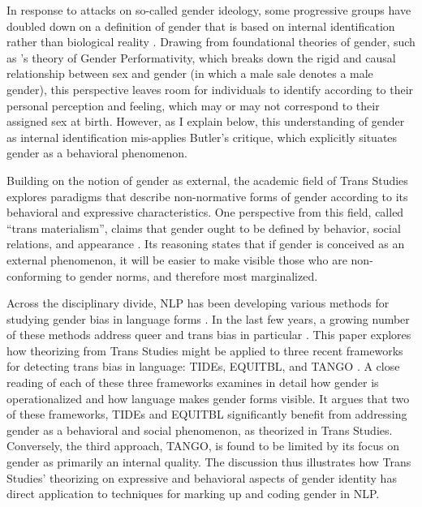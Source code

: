 \documentclass[anonymous,review]{acmart}
\begin{document}
In response to attacks on so-called gender ideology, some progressive groups have doubled down on a definition of gender that is based on internal identification rather than biological reality \citep{drescher:2025}. Drawing from foundational theories of gender, such as \citet{butler:1990}'s theory of Gender Performativity, which breaks down the rigid and causal relationship between sex and gender (in which a male sale denotes a male gender), this perspective leaves room for individuals to identify according to their personal perception and feeling, which may or may not correspond to their assigned sex at birth. However, as I explain below, this understanding of gender as internal identification mis-applies Butler’s critique, which explicitly situates gender as a behavioral phenomenon.

Building on the notion of gender as external, the academic field of Trans Studies explores paradigms that describe non-normative forms of gender according to its behavioral and expressive characteristics. One perspective from this field, called “trans materialism”, claims that gender ought to be defined by behavior, social relations, and appearance \citep{amin:2022}. Its reasoning states that if gender is conceived as an external phenomenon, it will be easier to make visible those who are non-conforming to gender norms, and therefore most marginalized.

Across the disciplinary divide, NLP has been developing various methods for studying gender bias in language forms \citep{bolukbasi:2016,rudinger:2018,guo:2021,kaneko:2024}. In the last few years, a growing number of these methods address queer and trans bias in particular \citep{felkner:2023,ovalle:2023,lameiro:2025,devinney:2024}. This paper explores how theorizing from Trans Studies might be applied to three recent frameworks for detecting trans bias in language: TIDEs, EQUITBL, and TANGO \citep{lameiro:2025,devinney:2024,ovalle:2023}. A close reading of each of these three frameworks examines in detail how gender is operationalized and how language makes gender forms visible. It argues that two of these frameworks, TIDEs and EQUITBL significantly benefit from addressing gender as a behavioral and social phenomenon, as theorized in Trans Studies. Conversely, the third approach, TANGO, is found to be limited by its focus on gender as primarily an internal quality. The discussion thus illustrates how Trans Studies’ theorizing on expressive and behavioral aspects of gender identity has direct application to techniques for marking up and coding gender in NLP. 
\end{document}
